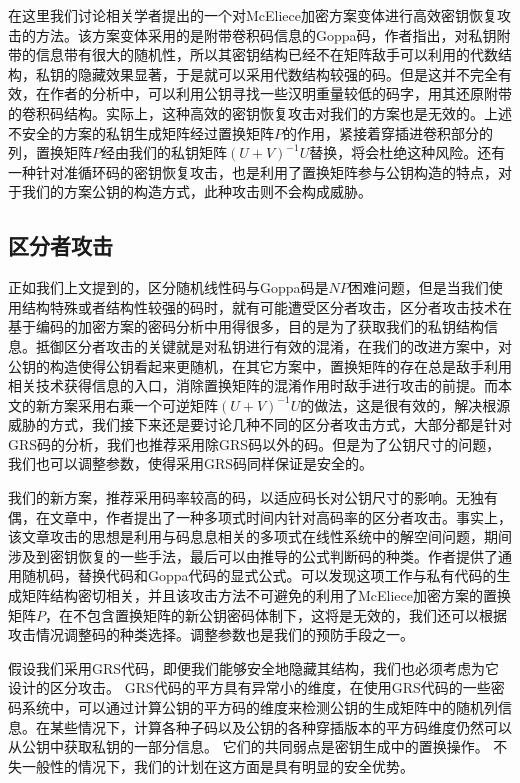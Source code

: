 在这里我们讨论相关学者提出的一个对McEliece加密方案变体进行高效密钥恢复攻击的方法。该方案变体采用的是附带卷积码信息的Goppa码，作者指出，对私钥附带的信息带有很大的随机性，所以其密钥结构已经不在矩阵敌手可以利用的代数结构，私钥的隐藏效果显著，于是就可以采用代数结构较强的码。但是这并不完全有效，在作者的分析中，可以利用公钥寻找一些汉明重量较低的码字，用其还原附带的卷积码结构。实际上，这种高效的密钥恢复攻击对我们的方案也是无效的。上述不安全的方案的私钥生成矩阵经过置换矩阵$P$的作用，紧接着穿插进卷积部分的列，置换矩阵$P$经由我们的私钥矩阵$(U+V)^{-1}U$替换，将会杜绝这种风险。还有一种针对准循环码的密钥恢复攻击，也是利用了置换矩阵参与公钥构造的特点，对于我们的方案公钥的构造方式，此种攻击则不会构成威胁。

\subsection{区分者攻击}
正如我们上文提到的，区分随机线性码与Goppa码是$NP$困难问题，但是当我们使用结构特殊或者结构性较强的码时，就有可能遭受区分者攻击，区分者攻击技术在基于编码的加密方案的密码分析中用得很多，目的是为了获取我们的私钥结构信息。抵御区分者攻击的关键就是对私钥进行有效的混淆，在我们的改进方案中，对公钥的构造使得公钥看起来更随机，在其它方案中，置换矩阵的存在总是敌手利用相关技术获得信息的入口，消除置换矩阵的混淆作用时敌手进行攻击的前提。而本文的新方案采用右乘一个可逆矩阵$(U+V)^{-1}U$的做法，这是很有效的，解决根源威胁的方式，我们接下来还是要讨论几种不同的区分者攻击方式，大部分都是针对GRS码的分析，我们也推荐采用除GRS码以外的码。但是为了公钥尺寸的问题，我们也可以调整参数，使得采用GRS码同样保证是安全的。

我们的新方案，推荐采用码率较高的码，以适应码长对公钥尺寸的影响。无独有偶，在文章中，作者提出了一种多项式时间内针对高码率的区分者攻击。事实上，该文章攻击的思想是利用与码息息相关的多项式在线性系统中的解空间问题，期间涉及到密钥恢复的一些手法，最后可以由推导的公式判断码的种类。作者提供了通用随机码，替换代码和Goppa代码的显式公式。可以发现这项工作与私有代码的生成矩阵结构密切相关，并且该攻击方法不可避免的利用了McEliece加密方案的置换矩阵$P$，在不包含置换矩阵的新公钥密码体制下，这将是无效的，我们还可以根据攻击情况调整码的种类选择。调整参数也是我们的预防手段之一。

假设我们采用GRS代码，即便我们能够安全地隐藏其结构，我们也必须考虑为它设计的区分攻击。 GRS代码的平方具有异常小的维度，在使用GRS代码的一些密码系统中，可以通过计算公钥的平方码的维度来检测公钥的生成矩阵中的随机列信息。在某些情况下，计算各种子码以及公钥的各种穿插版本的平方码维度仍然可以从公钥中获取私钥的一部分信息。 它们的共同弱点是密钥生成中的置换操作。 不失一般性的情况下，我们的计划在这方面是具有明显的安全优势。

